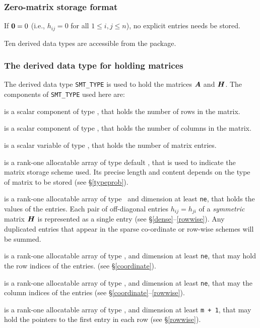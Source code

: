 \documentclass{galahad}
\begin{document}
\subsubsection{Zero-matrix storage format}\label{zero}
If ${\bm{0}} = 0$ (i.e., $h_{ij} = 0$ for all $1 \leq i, j \leq n$),
no explicit entries needs be stored.








\galtypes
Ten derived data types are accessible from the package.


\subsubsection{The derived data type for holding matrices}\label{typesmt}
The derived data type {\tt SMT\_TYPE} is used to hold the matrices ${\bm{A}}$
and ${\bm{H}}$.
The components of {\tt SMT\_TYPE} used here are:

\begin{description}

 is a scalar component of type \integer,
that holds the number of rows in the matrix.

 is a scalar component of type \integer,
that holds the number of columns in the matrix.

 is a scalar variable of type \integer, that
holds the number of matrix entries.

 is a rank-one allocatable array of type default \character, that
is used to indicate the matrix storage scheme used. Its precise length and
content depends on the type of matrix to be stored (see \S\ref{typeprob}).

 is a rank-one allocatable array of type \realdp\,
and dimension at least {\tt ne}, that holds the values of the entries.
Each pair of off-diagonal entries $h_{ij} = h_{ji}$ of a {\em symmetric}
matrix ${\bm{H}}$ is represented as a single entry
(see \S\ref{dense}--\ref{rowwise}).
Any duplicated entries that appear in the sparse
co-ordinate or row-wise schemes will be summed.

 is a rank-one allocatable array of type \integer,
and dimension at least {\tt ne}, that may hold the row indices of the entries.
(see \S\ref{coordinate}).

 is a rank-one allocatable array of type \integer,
and dimension at least {\tt ne}, that may the column indices of the entries
(see \S\ref{coordinate}--\ref{rowwise}).

 is a rank-one allocatable array of type \integer,
and dimension at least {\tt m + 1}, that may hold the pointers to
the first entry in each row (see \S\ref{rowwise}).

\end{description}
\end{document}

